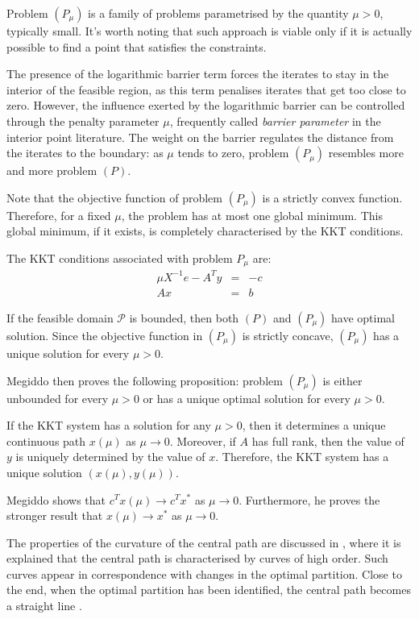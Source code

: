 Problem $(P_\mu)$ is a family of problems parametrised by the quantity $\mu>0$,
typically small. 
It's worth noting that such approach is 
viable only if it is actually possible to find a point that 
satisfies the constraints.

The presence of the logarithmic barrier term forces the iterates 
to stay in the interior of the feasible region, as this term penalises 
iterates that get too close to zero. However, the influence exerted
by the logarithmic barrier can be controlled through the penalty
parameter $\mu$, frequently called {\em barrier parameter} in the interior
point literature. 
The weight on the barrier regulates the distance from the iterates to 
the boundary: as $\mu$ tends to zero, problem $(P_\mu)$ resembles
more and more problem $(P)$.

Note that the objective function of problem $(P_\mu)$
is a strictly convex function. 
Therefore, for a fixed $\mu$, the problem has at most one global minimum. 
This global minimum, if it exists, is completely characterised 
by the KKT conditions.

The KKT conditions associated with problem $P_\mu$ are:
\[
\begin{array}{lcc}
  \mu X^{-1}e -A^Ty & = & -c \\
   Ax               & = &  b
\end{array}
\]

If the feasible domain $\mathcal{P}$ is bounded, 
then both $(P)$ and $(P_\mu)$ have optimal solution. Since the 
objective function in $(P_\mu)$ is strictly concave, $(P_\mu)$ 
has a unique solution for every $\mu>0$.

Megiddo then proves the following proposition: problem $(P_\mu)$ 
is either unbounded for every  $\mu>0$ or has a unique optimal 
solution for every $\mu>0$.

If the KKT system has a solution for any $\mu>0$, then it 
determines a unique continuous path $x(\mu)$ as $\mu\to 0$. 
Moreover, if $A$ has full rank, then the value of $y$ is 
uniquely determined by the value of $x$. Therefore, the KKT 
system has a unique solution $(x(\mu),y(\mu))$.

Megiddo shows that $c^Tx(\mu)\to c^Tx^*$ as $\mu\to 0$. 
Furthermore, he proves the stronger result that 
$x(\mu)\to x^*$ as $\mu\to 0$.

The properties of the curvature of the central path are discussed
in \cite{VavasisYe}, where it is explained that the central path
is characterised by curves of high order. 
Such curves appear in correspondence with changes in the optimal
partition.
Close to the end, when the optimal partition has been identified,
 the central path becomes a straight line \cite{Megiddo}.


